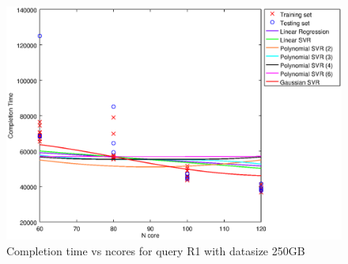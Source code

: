 
\begin {figure}[hbtp]
\centering
\includegraphics[width=\textwidth]{output/R1_250_LINEAR_NCORE/plot_R1_250.eps}
\caption{Completion time vs ncores for query R1 with datasize 250GB}
\label{fig:coreonly_linear_R1_250}
\end {figure}
